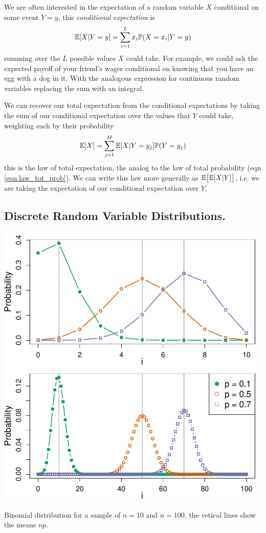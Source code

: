 We are often interested in the expectation of a random variable $X$
conditional on some event $Y=y$, this \emph{conditional expectation} is
\begin{equation}
\mathbb{E}[X|Y=y] = \sum_{i=1}^L x_i \mathbb{P}(X=x_i|Y=y) 
 \end{equation}
summing over the $L $ possible values $X$ could take. For example, we could ask the expected payoff of your friend's wager
conditional on knowing that you have an egg with a dog in it. With the
analogous expression for continuous random variables replacing the sum
with an integral.

We can recover our total expectation from the conditional expectations
by taking the sum of our conditional expectation over the values that
$Y$ could take, weighting each by their probability
\begin{equation} 
\mathbb{E}[X] = \sum_{j=1}^M \mathbb{E}[X|Y=y_j] \mathbb{P}(Y=y_j)  \label{eqn:tot_exptation_def}
 \end{equation}
this is the law of total expectation, the analog to the law of total
probability (eqn \eqref{eqn:law_tot_prob}). We can write this law more
generally as $\mathbb{E} \big[\mathbb{E}[X|Y]\big]$, i.e. we are taking the
expectation of our conditional expectation over $Y$. 
 
\subsection{Discrete Random Variable Distributions.}

 \begin{marginfigure}
 \begin{center}
   \includegraphics[width=\textwidth]{math_background/dist_pics/Binomial.pdf}\end{center}
 \caption{Binomial distribution for a sample of $n=10$ and $n=100$,
   the vetical lines show the means $np$. }\label{Fig:binomial}
 \end{marginfigure}

